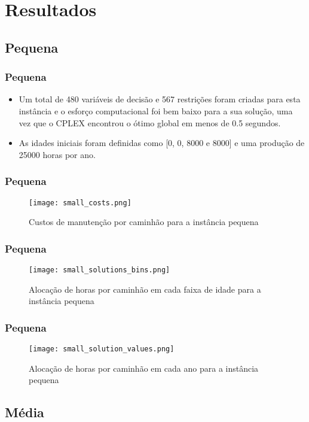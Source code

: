 \documentclass{beamer}
\begin{document}
\section{Resultados}

\subsection{Pequena}
\begin{frame}
	\frametitle{Pequena}
	\begin{itemize}
		\item Um total de 480 variáveis de decisão e 567 restrições foram criadas para esta instância e o esforço computacional foi bem baixo para a sua solução, uma vez que o CPLEX encontrou o ótimo global em menos de 0.5 segundos.
		\item As idades iniciais foram definidas como [0, 0, 8000 e 8000] e uma produção de 25000 horas por ano.
	\end{itemize}
\end{frame}


\begin{frame}
	\frametitle{Pequena}
	\begin{figure}[h!]
		\centering
		\texttt{[image: small\_costs.png]}
		\caption{Custos de manutenção por caminhão para a instância pequena}
		\label{fig:small_costs}
	\end{figure}
\end{frame}

\begin{frame}
	\frametitle{Pequena}
	\begin{figure}[h!]
		\centering
		\texttt{[image: small\_solutions\_bins.png]}
		\caption{Alocação de horas por caminhão em cada faixa de idade para a instância pequena}
		\label{fig:small_solutions_bins}
	\end{figure}
\end{frame}

\begin{frame}
	\frametitle{Pequena}
	\begin{figure}[h!]
		\centering
		\texttt{[image: small\_solution\_values.png]}
		\caption{Alocação de horas por caminhão em cada ano para a instância pequena}
		\label{fig:small_solution_values}
	\end{figure}
\end{frame}

\subsection{Média}
\end{document}

